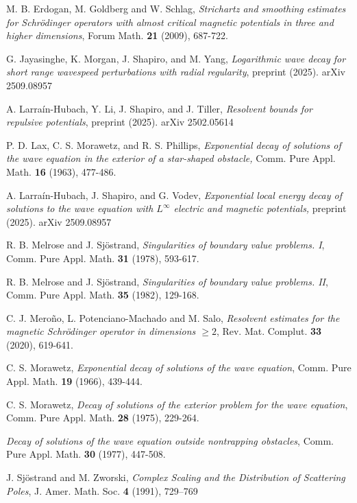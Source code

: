 \documentclass[11pt]{amsart}
\numberwithin{equation}{section}
\begin{document}
\begin{thebibliography}
 {\sc M. B. Erdogan, M. Goldberg and W. Schlag}, {\em Strichartz and smoothing estimates for Schr\"odinger operators
with almost critical magnetic potentials in three and higher dimensions}, Forum Math. {\bf 21} (2009), 687-722.


 {\sc G. Jayasinghe, K. Morgan, J. Shapiro, and M. Yang}, {\em Logarithmic wave decay for short range wavespeed perturbations with radial regularity}, preprint (2025). arXiv 2509.08957

  {\sc A. Larra\'in-Hubach, Y. Li, J. Shapiro, and J. Tiller}, {\em Resolvent bounds for repulsive potentials}, preprint (2025). arXiv 2502.05614

 {\sc P. D. Lax, C. S. Morawetz, and R. S. Phillips}, {\em Exponential decay of solutions of the wave equation in the exterior of a star-shaped obstacle,} Comm. Pure Appl. Math. {\bf16 } (1963), 477-486.


 {\sc A. Larra\'in-Hubach, J. Shapiro, and G. Vodev}, {\em Exponential local energy decay of solutions to the wave equation with $L^\infty$ electric and magnetic potentials,} preprint (2025). arXiv 2509.08957

 {\sc R. B. Melrose and J. Sj\"ostrand}, {\em Singularities of boundary value problems. I}, Comm. Pure Appl. Math. 
{\bf 31} (1978), 593-617.

 {\sc R. B. Melrose and J. Sj\"ostrand}, {\em Singularities of boundary value problems. II}, Comm. Pure Appl. Math. 
{\bf 35} (1982), 129-168.


 {\sc C. J. Mero\~no, L. Potenciano-Machado and M. Salo}, {\em Resolvent estimates for the magnetic Schr\"odinger operator
in dimensions $\ge 2$}, Rev. Mat. Complut. {\bf 33} (2020), 619-641.

 {\sc C. S. Morawetz}, {\em Exponential decay of solutions of the wave equation}, Comm. Pure Appl. Math. {\bf 19} (1966),
439-444.

 {\sc C. S. Morawetz}, {\em Decay of solutions of the exterior problem for the wave equation}, Comm. Pure Appl. Math. {\bf 28} (1975), 229-264. 

 {\em Decay of solutions of the wave equation outside nontrapping obstacles}, Comm. Pure Appl. Math.  {\bf 30}  (1977), 447-508.


 {\sc J. Sj\"ostrand and M. Zworski}, {\em Complex Scaling and the Distribution of Scattering Poles},
J. Amer. Math. Soc. {\bf 4} (1991), 729--769


\end{thebibliography}
\end{document}
